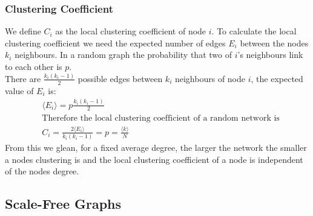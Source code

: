 \documentclass{article}
\begin{document}
            \subsubsection{Clustering Coefficient}
            We define $C_i$ as the local clustering coefficient of node $i$. To calculate the local clustering coefficient we need the expected number of edges $E_i$ between the nodes $k_i$ neighbours. In a random graph the probability that two of $i$'s neighbours link to each other is $p$.\\ 
            There are $\frac{k_{i}(k_{i}-1)}{2}$ possible edges between $k_i$ neighbours of node $i$, the expected value of $E_i$ is:
            \begin{align*}
                &\langle E_i \rangle = p\frac{k_{i}(k_{i}-1)}{2}\\
                &\text{Therefore the local clustering coefficient of a random network is}\\
                &C_i = \frac{2\langle E_i \rangle}{k_{i}(k_{i}-1)} = p = \frac{\langle k \rangle}{N}
            \end{align*} 
            From this we glean, for a fixed average degree, the larger the network the smaller a nodes clustering is and the local clustering coefficient of a node is independent of the nodes degree.
        \subsection{Scale-Free Graphs}
\end{document}
